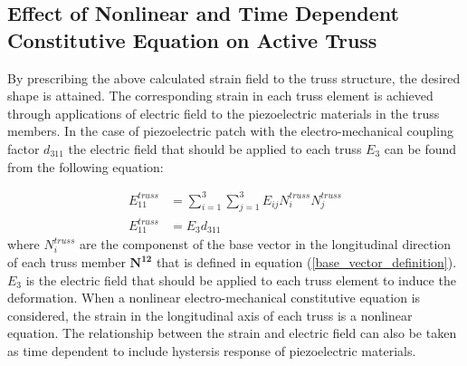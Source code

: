 \subsection{Effect of Nonlinear and Time Dependent Constitutive Equation on Active Truss}
By prescribing the above calculated strain field to the truss structure, the desired shape is attained. The corresponding strain in each truss element is achieved through applications of electric field to the piezoelectric materials in the truss members.
In the case of piezoelectric patch with the electro-mechanical coupling factor $d_{311}$ the electric field that should be applied to each truss $E_3$ can be found from the following equation:

\begin{equation}
\begin{aligned}
E_{11}^{truss} &=\sum_{i=1}^3 \sum_{j=1}^3 E_{ij}N^{truss}_i N^{truss}_j\\
E_{11}^{truss} &=E_3 d_{311} 
\end{aligned}
\label{electric_field_in_each_truss:eqn}
\end{equation}
where 
$N^{truss}_{i}$ are the componenst of the base vector in the longitudinal direction of each truss member $\mathbf {N^{12}}$ that is defined in equation (\ref{base_vector_definition}).
$E_3$ is the electric field that should be applied to each truss element to induce the deformation.
When a nonlinear electro-mechanical constitutive equation is considered, the strain in the longitudinal axis of each truss is a nonlinear equation.
The relationship between the strain and electric field can also be taken as time dependent to include hystersis response of piezoelectric materials.

